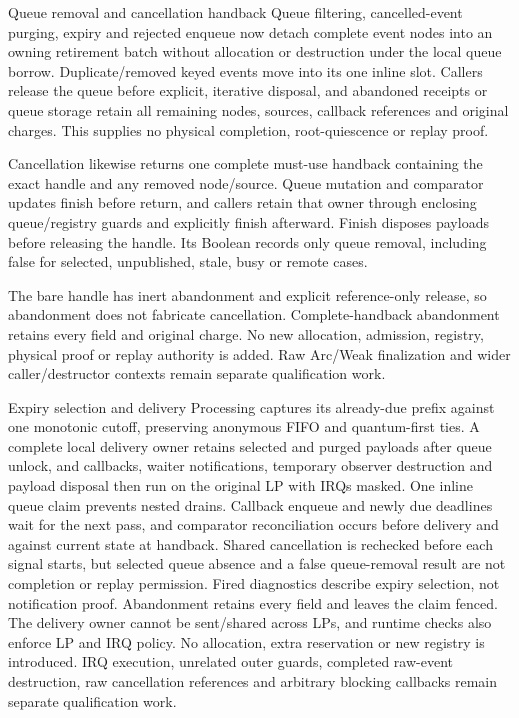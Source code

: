 \begin{implementationdetail}{Queue removal and cancellation handback}
Queue filtering, cancelled-event purging, expiry and rejected enqueue now
detach complete event nodes into an owning retirement batch without allocation
or destruction under the local queue borrow. Duplicate/removed keyed events
move into its one inline slot. Callers release the queue before explicit,
iterative disposal, and abandoned receipts or queue storage retain all remaining
nodes, sources, callback references and original charges. This supplies no
physical completion, root-quiescence or replay proof.

Cancellation likewise returns one complete must-use handback containing the
exact handle and any removed node/source. Queue mutation and comparator updates
finish before return, and callers retain that owner through enclosing queue/registry
guards and explicitly finish afterward. Finish disposes payloads before releasing
the handle. Its Boolean records only queue removal, including false for selected,
unpublished, stale, busy or remote cases.

The bare handle has inert abandonment
and explicit reference-only release, so abandonment does not fabricate cancellation.
Complete-handback abandonment retains every field and original charge. No new
allocation, admission, registry, physical proof or replay authority is added.
Raw Arc/Weak finalization and wider caller/destructor contexts remain separate
qualification work.
\end{implementationdetail}

\begin{implementationdetail}{Expiry selection and delivery}
Processing captures its already-due prefix against one monotonic cutoff,
preserving anonymous FIFO and quantum-first ties. A complete local delivery
owner retains selected and purged payloads after queue unlock, and callbacks,
waiter notifications, temporary observer destruction and payload disposal then
run on the original LP with IRQs masked. One inline queue claim prevents nested
drains. Callback enqueue and newly due deadlines wait for the next pass, and
comparator reconciliation occurs before delivery and against current state at
handback. Shared cancellation is rechecked before each signal starts, but selected
queue absence and a false queue-removal result are not completion or replay
permission. Fired diagnostics describe expiry selection, not notification proof.
Abandonment retains every field and leaves the claim fenced. The delivery owner
cannot be sent/shared across LPs, and runtime checks also enforce LP and IRQ policy.
No allocation, extra reservation or new registry is introduced. IRQ execution,
unrelated outer guards, completed raw-event destruction, raw cancellation
references and arbitrary blocking callbacks remain separate qualification work.
\end{implementationdetail}

